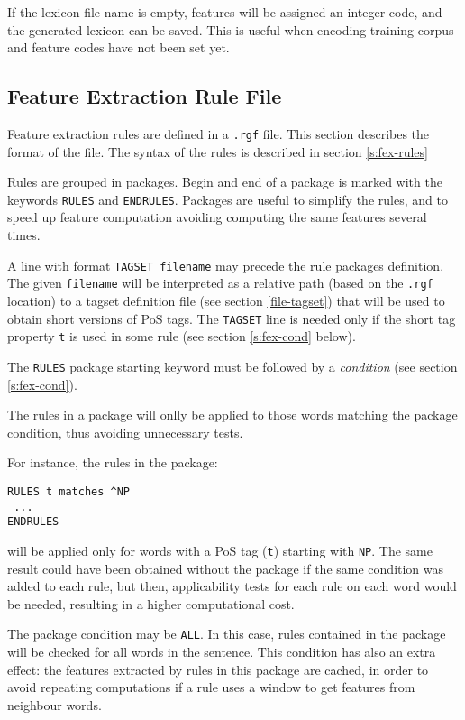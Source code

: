 \documentclass[a4paper]{book}
\begin{document}
  If the lexicon file name is empty, features will be assigned an integer
  code, and the generated lexicon can be saved. This is useful when
  encoding training corpus and feature codes have not been set yet.

\subsection{Feature Extraction Rule File}
\label{fex-file}

  Feature extraction rules are defined in a {\tt .rgf} file. This
  section describes the format of the file. The syntax of the
  rules is described in section \ref{s:fex-rules}

  Rules are grouped in packages. Begin and end of a package is marked
  with the keywords \verb#RULES# and \verb#ENDRULES#.
  Packages are useful to simplify the rules, and to speed up
  feature computation avoiding computing the same features several
  times.

  A line with format \verb#TAGSET filename# may precede the rule
  packages definition. The given \verb#filename# will be interpreted
  as a relative path (based on the {\tt .rgf} location) to a tagset
  definition file (see section \ref{file-tagset}) that will be used to
  obtain short versions of PoS tags. The \verb#TAGSET# line is 
  needed only if the short tag property {\tt t} is used in some
  rule (see section \ref{s:fex-cond} below).

  The \verb#RULES# package starting keyword must be followed by a 
  \textit{condition} (see section \ref{s:fex-cond}).

  The rules in a package will onlly be applied to those words matching 
  the package condition, thus avoiding unnecessary tests.

  \noindent For instance, the rules in the package:
\begin{verbatim} 
RULES t matches ^NP
 ...
ENDRULES
\end{verbatim} 
  \noindent will be applied only for words with a PoS tag ({\tt t})
  starting with {\tt NP}. The same result could have been obtained
  without the package if the same condition was added to each rule,
  but then, applicability tests for each rule on each word would be
  needed, resulting in a higher computational cost.

  The package condition may be {\tt ALL}. In this case, rules
  contained in the package will be checked for all words in the
  sentence.  This condition has also an extra effect: the features
  extracted by rules in this package are cached, in order to avoid
  repeating computations if a rule uses a window to get features from
  neighbour words.
\end{document}

